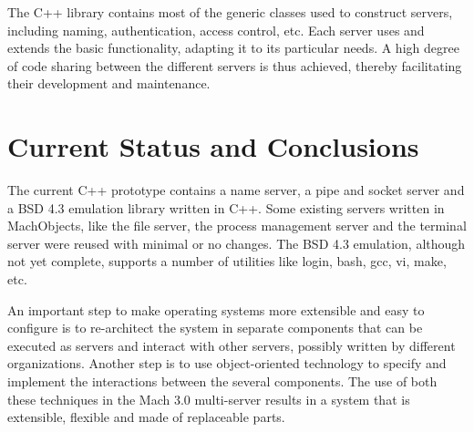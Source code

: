 The C++ library contains most of the generic classes used to construct
servers, including naming, authentication, access control, etc. Each
server uses and extends the basic functionality, adapting it to its
particular needs. A high degree of code sharing between the different
servers is thus achieved, thereby facilitating their development and
maintenance. 

\section{Current Status and Conclusions}

The current C++ prototype contains a name server, a pipe and socket
server and a BSD 4.3 emulation library written in C++. Some existing
servers written in MachObjects, like the file server, the process
management server and the terminal server were reused with minimal or
no changes. The BSD 4.3 emulation, although not yet complete, supports
a number of utilities like login, bash, gcc, vi, make, etc.

An important step to make operating systems more extensible and easy
to configure is to re-architect the system in separate components that
can be executed as servers and interact with other servers, possibly
written by different organizations. Another step is to use
object-oriented technology to specify and implement the interactions
between the several components. The use of both these techniques in
the Mach 3.0 multi-server results in a system that is extensible,
flexible and made of replaceable parts.


